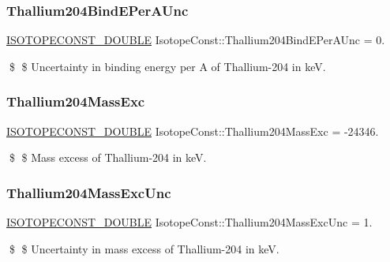 \subsubsection{\texorpdfstring{Thallium204\+Bind\+E\+Per\+A\+Unc}{Thallium204BindEPerAUnc}}
{\footnotesize\ttfamily \mbox{\hyperlink{group___isotope_const-_macros_ga8f45a7272ce02c0b4c65c44636ed719a}{I\+S\+O\+T\+O\+P\+E\+C\+O\+N\+S\+T\+\_\+\+D\+O\+U\+B\+LE}} Isotope\+Const\+::\+Thallium204\+Bind\+E\+Per\+A\+Unc = 0.}

\$ \$ Uncertainty in binding energy per A of Thallium-\/204 in keV. \mbox{\label{group___isotope_const-_thallium-_tl204_gab0e55ef28d89b6cdaa55c86e30b58311}} 
\subsubsection{\texorpdfstring{Thallium204\+Mass\+Exc}{Thallium204MassExc}}
{\footnotesize\ttfamily \mbox{\hyperlink{group___isotope_const-_macros_ga8f45a7272ce02c0b4c65c44636ed719a}{I\+S\+O\+T\+O\+P\+E\+C\+O\+N\+S\+T\+\_\+\+D\+O\+U\+B\+LE}} Isotope\+Const\+::\+Thallium204\+Mass\+Exc = -\/24346.}

\$ \$ Mass excess of Thallium-\/204 in keV. \mbox{\label{group___isotope_const-_thallium-_tl204_gafdc85b40120d0b321594facd74a702ad}} 
\subsubsection{\texorpdfstring{Thallium204\+Mass\+Exc\+Unc}{Thallium204MassExcUnc}}
{\footnotesize\ttfamily \mbox{\hyperlink{group___isotope_const-_macros_ga8f45a7272ce02c0b4c65c44636ed719a}{I\+S\+O\+T\+O\+P\+E\+C\+O\+N\+S\+T\+\_\+\+D\+O\+U\+B\+LE}} Isotope\+Const\+::\+Thallium204\+Mass\+Exc\+Unc = 1.}

\$ \$ Uncertainty in mass excess of Thallium-\/204 in keV. \mbox{\label{group___isotope_const-_thallium-_tl204_gaa15aa7bd512397d9e3656131146967ed}} 
